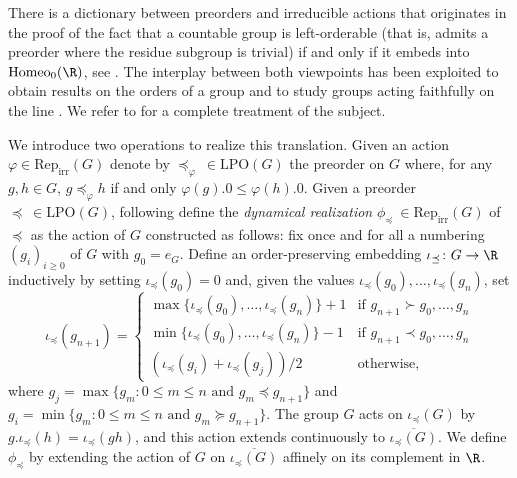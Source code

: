 \documentclass[reqno]{amsart}
\begin{document}
There is a dictionary between preorders and irreducible actions that originates in the proof of the fact that a countable group is left-orderable (that is, admits a preorder where the residue subgroup is trivial) if and only if it embeds into $\mathrm{Homeo}_0(\R)$, see \cite[Theorem 6.8]{Ghys2001}. The interplay between both viewpoints has been exploited to obtain results on the orders of a group \cite{Navas2010} and to study groups acting faithfully on the line \cite{WitteMorris2006}. We refer to \cite{DeroinNavasRivas2016} for a complete treatment of the subject.

We introduce two operations to realize this translation. Given an action $\varphi \in \mathrm{Rep}_\mathrm{irr}(G)$ denote by $\preceq_\varphi \  \in \mathrm{LPO}(G)$ the preorder on $G$ where, for any $g,h \in G$, $g \preceq_\varphi h$ if and only $\varphi(g).0 \leq \varphi(h).0$. Given a preorder $\preceq \  \in \mathrm{LPO}(G)$, following \cite[Theorem 6.8]{Ghys2001} define the \emph{dynamical realization} $\phi_\preceq \ \in \mathrm{Rep}_\mathrm{irr}(G)$ of $\preceq$ as the action of $G$ constructed as follows: fix once and for all a numbering $(g_i)_{i \geq 0}$ of $G$ with $g_0 = e_G$. Define an order-preserving embedding $\iota_\preceq \colon G \to \R$ inductively by setting $\iota_\preceq(g_0) = 0$ and, given the values $\iota_\preceq(g_0),\ldots, \iota_\preceq(g_n)$, set
\[
	\iota_\preceq(g_{n+1}) = \begin{cases} \max\{\iota_\preceq(g_0),\ldots, \iota_\preceq(g_n)\} + 1 & \text{if }g_{n+1} \succ g_0,\ldots, g_n\\
					\min\{\iota_\preceq(g_0),\ldots, \iota_\preceq(g_n)\} - 1 & \text{if }g_{n+1} \prec g_0,\ldots, g_n\\
					(\iota_\preceq(g_i) + \iota_\preceq(g_{j}))/2 & \text{otherwise, }
			\end{cases}
\]
where $g_j = \max\{g_m : 0\leq m\leq n \text{ and } g_m\preceq g_{n+1}\}$ and $g_i = \min\{g_m : 0\leq m\leq n \text{ and } g_m \succeq g_{n+1}\}$. The group $G$ acts on $\iota_\preceq(G)$ by $g.\iota_\preceq(h) = \iota_\preceq(gh)$, and this action extends continuously to $\overline{\iota_\preceq(G)}$. We define $\phi_\preceq$ by extending the action of $G$ on $\overline{\iota_\preceq(G)}$ affinely on its complement in $\R$.
\end{document}
